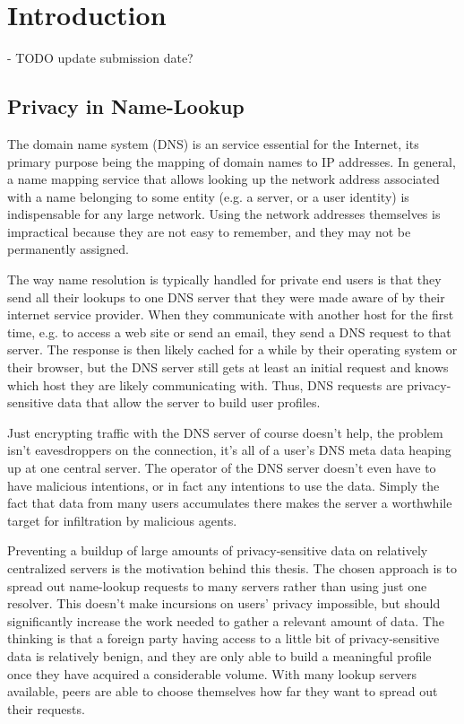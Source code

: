 \chapter{Introduction}
- TODO update submission date?

\section{Privacy in Name-Lookup}
The domain name system (DNS) is an service essential for the Internet, its
primary purpose being the mapping of domain names to IP addresses. In general, a
name mapping service that allows looking up the network address associated with
a name belonging to some entity (e.g. a server, or a user identity) is
indispensable for any large network. Using the network addresses themselves is
impractical because they are not easy to remember, and they may not be
permanently assigned.

The way name resolution is typically handled for private end users is that they
send all their lookups to one DNS server that they were made aware of by their
internet service provider. When they communicate with another host for the first
time, e.g. to access a web site or send an email, they send a DNS request to
that server. The response is then likely cached for a while by their
operating system or their browser, but the DNS server still gets at least an
initial request and knows which host they are likely communicating with. Thus,
DNS requests are privacy-sensitive data that allow the server to build user
profiles.

Just encrypting traffic with the DNS server of course doesn't help, the problem
isn't eavesdroppers on the connection, it's all of a user's DNS meta data
heaping up at one central server. The operator of the DNS server doesn't even
have to have malicious intentions, or in fact any intentions to use the data.
Simply the fact that data from many users accumulates there makes the server a
worthwhile target for infiltration by malicious agents.

Preventing a buildup of large amounts of privacy-sensitive data on relatively
centralized servers is the motivation behind this thesis. The chosen approach is
to spread out name-lookup requests to many servers rather than using just one
resolver. This doesn't make incursions on users' privacy impossible, but should
significantly increase the work needed to gather a relevant amount of data. The
thinking is that a foreign party having access to a little bit of
privacy-sensitive data is relatively benign, and they are only able to build a
meaningful profile once they have acquired a considerable volume. With many
lookup servers available, peers are able to choose themselves how far they want
to spread out their requests.

